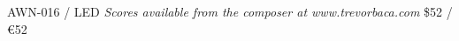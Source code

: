 \documentclass{article}
\begin{document}
\null \vfill

AWN-016 / LED \hfill
\textit{Scores available from the composer at www.trevorbaca.com}
\hfill \$52 / \euro 52
\end{document}
